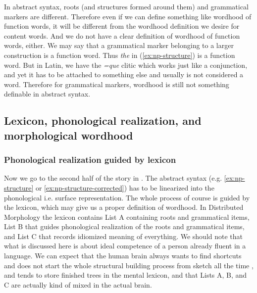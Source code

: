 \documentclass[a4paper, oneside, scheme=plain, 12pt]{article}
\newcommand{\form}[1]{\emph{#1}}
\begin{document}
In abstract syntax, roots (and structures formed around them) and grammatical markers are different.
Therefore even if we can define something like wordhood of function words,
it will be different from the wordhood definition we desire for content words.
And we do not have a clear definition of wordhood of function words, either.
We may say that a grammatical marker belonging to a larger construction is a function word.
Thus \form{the} in (\ref{ex:np-structure}) is a function word.
But in Latin, we have the \form{=que} clitic which works just like a conjunction,
and yet it has to be attached to something else and usually is not considered a word.
Therefore for grammatical markers, wordhood is still not something definable in abstract syntax.

\subsection{Lexicon, phonological realization, and morphological wordhood}\label{sec:vocabulary-inesrtion}

\subsubsection{Phonological realization guided by lexicon}\label{sec:realization}

Now we go to the second half of the story in .
The abstract syntax (e.g. \ref{ex:np-structure} or \ref{ex:np-structure-corrected})
has to be linearized into the phonological i.e. surface representation.
The whole process of course is guided by the lexicon,
which may give us a proper definition of wordhood.
In Distributed Morphology the lexicon contains List A containing roots and grammatical items,
List B that guides phonological realization of the roots and grammatical items,
and List C that records idiomized meaning of everything.
We should note that what is discussed here is about ideal competence of a person already fluent in a language.
We can expect that the human brain always wants to find shortcuts
and does not start the whole structural building process from sketch all the time \citep{matchin2020cortical},
and tends to store finished trees in the mental lexicon,
and that Lists A, B, and C are actually kind of mixed in the actual brain. 
\end{document}
